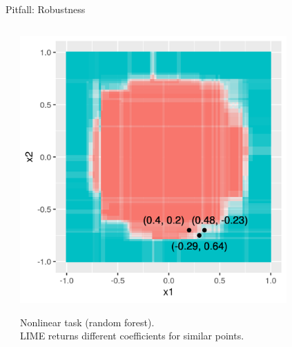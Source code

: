 \documentclass[11pt,compress,t,notes=noshow, aspectratio=169, xcolor=table]{beamer}
\begin{document}
\begin{frame}{Pitfall: Robustness }
\begin{columns}[totalwidth=\textwidth]
\begin{column}{0.5\textwidth}
\begin{center}
		\end{center}
	\end{column}
	\begin{column}{0.5\textwidth}
		\begin{center}
	\includegraphics[width=0.8\textwidth]{figure/lime_robustness_2.png}
	
	{Nonlinear task (random forest). 
    \\LIME returns different coefficients for similar points.}
	
	\end{center}
\end{column}
\end{columns}
\end{frame}
\end{document}
